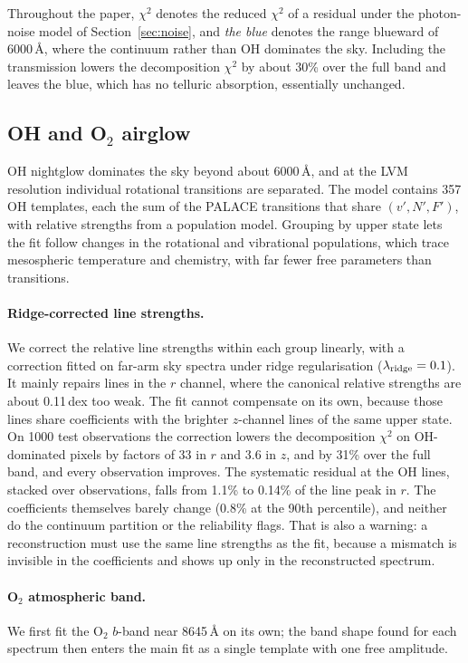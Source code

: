 Throughout the paper, $\chi^2$ denotes the reduced $\chi^2$ of a residual
under the photon-noise model of Section~\ref{sec:noise}, and \emph{the blue}
denotes the range blueward of 6000\,\AA, where the continuum rather than OH
dominates the sky. Including the transmission lowers the decomposition
$\chi^2$ by about 30\% over the full band and leaves the blue, which has no
telluric absorption, essentially unchanged.

\subsection{OH and O$_2$ airglow}
\label{sec:oh}

OH nightglow dominates the sky beyond about 6000\,\AA, and at the LVM
resolution individual rotational transitions are separated. The model
contains 357 OH templates, each the sum of the PALACE \citep{Noll2025}
transitions that share $(v', N', F')$, with relative strengths from a
population model. Grouping by upper state lets the fit follow changes in the
rotational and vibrational populations, which trace mesospheric temperature
and chemistry, with far fewer free parameters than transitions.

\paragraph{Ridge-corrected line strengths.} We correct the relative line
strengths within each group linearly, with a correction fitted on far-arm sky
spectra under ridge regularisation ($\lambda_{\rm ridge} = 0.1$). It mainly
repairs lines in the $r$ channel, where the canonical relative strengths are
about 0.11\,dex too weak. The fit cannot compensate on its own, because those
lines share coefficients with the brighter $z$-channel lines of the same
upper state. On 1000 test observations the correction lowers the
decomposition $\chi^2$ on OH-dominated pixels by factors of 33 in $r$ and 3.6
in $z$, and by 31\% over the full band, and every observation improves. The
systematic residual at the OH lines, stacked over observations, falls from
1.1\% to 0.14\% of the line peak in $r$. The coefficients themselves barely
change (0.8\% at the 90th percentile), and neither do the continuum partition
or the reliability flags. That is also a warning: a reconstruction must use
the same line strengths as the fit, because a mismatch is invisible in the
coefficients and shows up only in the reconstructed spectrum.

\paragraph{O$_2$ atmospheric band.} We first fit the O$_2$ $b$-band near
8645\,\AA{} on its own; the band shape found for each spectrum then enters
the main fit as a single template with one free amplitude.

